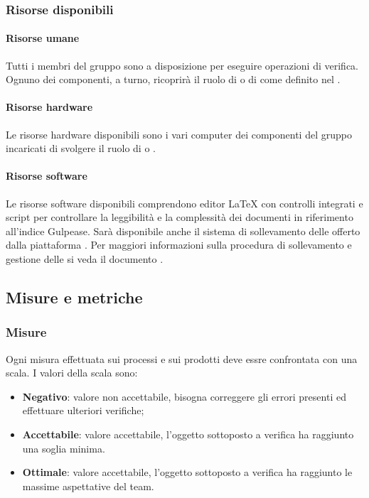\documentclass[PianoDiQualifica.tex]{subfiles}
\begin{document}
		\subsubsection{Risorse disponibili}
		
			\paragraph{Risorse umane}
			Tutti i membri del gruppo sono a disposizione per eseguire operazioni di verifica. Ognuno dei componenti, a turno, ricoprirà il ruolo di \RESP{} o di \VER{} come definito nel \PPdocRR{}.
			
			\paragraph{Risorse hardware}
			Le risorse hardware disponibili sono i vari computer dei componenti del gruppo incaricati di svolgere il ruolo di \RESP{} o \VER{}.
			
			\paragraph{Risorse software}
			Le risorse software disponibili comprendono editor \LaTeX{} con controlli integrati e script per controllare la leggibilità e la complessità dei documenti in riferimento all’indice Gulpease.
			Sarà disponibile anche il sistema di sollevamento delle  offerto dalla piattaforma . Per maggiori informazioni sulla procedura di sollevamento e gestione delle  si veda
			il documento \NPdocRR{}.
			
	\subsection{Misure e metriche}
	
		\subsubsection{Misure}
		Ogni misura effettuata sui processi e sui prodotti deve essre confrontata con una scala. I valori della scala sono:
		\begin{itemize}
			\item \textbf{Negativo}: valore non accettabile, bisogna correggere gli errori presenti ed effettuare ulteriori verifiche;
			\item \textbf{Accettabile}: valore accettabile, l’oggetto sottoposto a verifica ha raggiunto una soglia minima.
			\item \textbf{Ottimale}: valore accettabile, l’oggetto sottoposto a verifica ha raggiunto le massime aspettative del team.
		\end{itemize}
		
\end{document}
